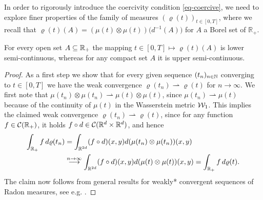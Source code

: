 In order to rigorously introduce the coercivity condition \eqref{eq-coercive}, we need to explore finer properties of the family of measures $(\varrho(t))_{t \in [0,T]}$, where we recall that 
$\varrho(t)(A)=(\mu(t)\otimes\mu(t))\bigl(d^{-1}(A)\bigr)$ for $A$ a Borel set of $\mathbb{R}_+$.

\begin{lemma}\label{rhosc}
	For every open set $A\subseteq\mathbb{R}_+$ the mapping $t \in [0,T] \mapsto\varrho(t)(A)$ is lower semi-continuous, whereas for
	any compact set $A$ it is upper semi-continuous.
\end{lemma}

\begin{proof}As a first step we show that for every given sequence $(t_n)_{n \in \mathbb{N}}$ converging to $t\in [0,T]$ we have the weak
	convergence $\varrho(t_n)\rightharpoonup\varrho(t)$ for $n \rightarrow \infty$. 
	We first note that $\mu(t_n)\otimes\mu(t_n)\rightharpoonup\mu(t)\otimes\mu(t)$, since $\mu(t_n)\rightharpoonup\mu(t)$ because of the continuity of $\mu(t)$ in the Wasserstein metric $\mathcal{W}_1$.	
%	
	This implies the claimed weak convergence $\varrho(t_n)\rightharpoonup\varrho(t)$, since for any
	function $f\in \mathcal{C}(\mathbb{R}_+)$, it holds $f\circ d\in\mathcal{C}(\mathbb{R}^d\times\mathbb{R}^d)$, and hence
	\begin{align*}
		\int_{\mathbb{R}_+}f\,d\varrho(t_n)
			&=\int_{\mathbb{R}^{2d}}(f\circ d)(x,y)d(\mu(t_n)\otimes\mu(t_n))(x,y)\\
			&\stackrel{n\rightarrow\infty}{\longrightarrow}
				\int_{\mathbb{R}^{2d}}(f\circ d)(x,y)d(\mu(t)\otimes\mu(t))(x,y)
			=\int_{\mathbb{R}_+}f\,d\varrho(t).
	\end{align*}
	The claim now follows from general results for weakly* convergent sequences of Radon measures, see e.g. \cite[Proposition 1.62]{AFP00}.
\end{proof}

